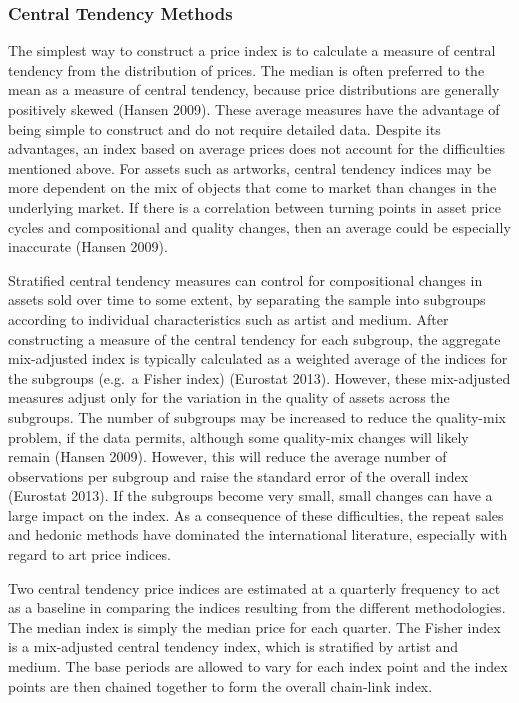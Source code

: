 \documentclass[]{elsarticle} %
\begin{document}
\subsubsection{Central Tendency Methods}\label{central-tendency-methods}

The simplest way to construct a price index is to calculate a measure of
central tendency from the distribution of prices. The median is often
preferred to the mean as a measure of central tendency, because price
distributions are generally positively skewed (Hansen 2009). These
average measures have the advantage of being simple to construct and do
not require detailed data. Despite its advantages, an index based on
average prices does not account for the difficulties mentioned above.
For assets such as artworks, central tendency indices may be more
dependent on the mix of objects that come to market than changes in the
underlying market. If there is a correlation between turning points in
asset price cycles and compositional and quality changes, then an
average could be especially inaccurate (Hansen 2009).

Stratified central tendency measures can control for compositional
changes in assets sold over time to some extent, by separating the
sample into subgroups according to individual characteristics such as
artist and medium. After constructing a measure of the central tendency
for each subgroup, the aggregate mix-adjusted index is typically
calculated as a weighted average of the indices for the subgroups
(e.g.~a Fisher index) (Eurostat 2013). However, these mix-adjusted
measures adjust only for the variation in the quality of assets across
the subgroups. The number of subgroups may be increased to reduce the
quality-mix problem, if the data permits, although some quality-mix
changes will likely remain (Hansen 2009). However, this will reduce the
average number of observations per subgroup and raise the standard error
of the overall index (Eurostat 2013). If the subgroups become very
small, small changes can have a large impact on the index. As a
consequence of these difficulties, the repeat sales and hedonic methods
have dominated the international literature, especially with regard to
art price indices.

Two central tendency price indices are estimated at a quarterly
frequency to act as a baseline in comparing the indices resulting from
the different methodologies. The median index is simply the median price
for each quarter. The Fisher index is a mix-adjusted central tendency
index, which is stratified by artist and medium. The base periods are
allowed to vary for each index point and the index points are then
chained together to form the overall chain-link index.
\end{document}
